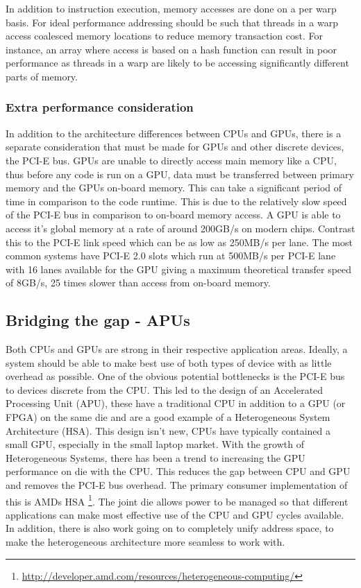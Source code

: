 In addition to instruction execution, memory accesses are done on a per warp
basis. For ideal performance addressing should be such that threads in a warp
access coalesced memory locations to reduce memory transaction cost. For
instance, an array where access is based on a hash function can result in poor
performance as threads in a warp are likely to be accessing significantly
different parts of memory.

\subsubsection{Extra performance consideration}

In addition to the architecture differences between CPUs and GPUs, there is a
separate consideration that must be made for GPUs and other discrete devices,
the PCI-E bus. GPUs are unable to directly access main memory like a CPU, thus
before any code is run on a GPU, data must be transferred between primary memory
and the GPUs on-board memory. This can take a significant period of time in
comparison to the code runtime. This is due to the relatively slow speed of the
PCI-E bus in comparison to on-board memory access. A GPU is able to access it's
global memory at a rate of around 200GB/s on modern chips. Contrast this to the
PCI-E link speed which can be as low as 250MB/s per lane. The most common
systems have PCI-E 2.0 slots which run at 500MB/s per PCI-E lane with 16 lanes
available for the GPU giving a maximum theoretical transfer speed of 8GB/s, 25
times slower than access from on-board memory.

\subsection{Bridging the gap - APUs}

Both CPUs and GPUs are strong in their respective application areas. Ideally, a
system should be able to make best use of both types of device with as little
overhead as possible. One of the obvious potential bottlenecks is the PCI-E bus
to devices discrete from the CPU. This led to the design of an Accelerated
Processing Unit (APU), these have a traditional CPU in addition to a GPU (or
FPGA) on the same die and are a good example of a Heterogeneous System
Architecture (HSA). This design isn't new, CPUs have typically contained a small
GPU, especially in the small laptop market. With the growth of Heterogeneous
Systems, there has been a trend to increasing the GPU performance on die with
the CPU. This reduces the gap between CPU and GPU and removes the PCI-E bus
overhead. The primary consumer implementation of this is AMDs HSA
\footnote{\url{http://developer.amd.com/resources/heterogeneous-computing/}}.
The joint die allows power to be managed so that different applications can make
most effective use of the CPU and GPU cycles available. In addition, there is
also work going on to completely unify address space, to make the heterogeneous
architecture more seamless to work with.

